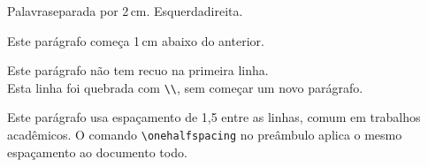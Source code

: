 \documentclass[a4paper]{article}
\begin{document}
Palavra\hspace{2cm}separada por 2\,cm. Esquerda\hfill direita.

\vspace{1cm}
Este parágrafo começa 1\,cm abaixo do anterior.

\noindent Este parágrafo não tem recuo na primeira linha.\\
Esta linha foi quebrada com \verb|\\|, sem começar um novo parágrafo.

\begin{onehalfspace}
Este parágrafo usa espaçamento de 1,5 entre as linhas, comum em trabalhos
acadêmicos. O comando \verb|\onehalfspacing| no preâmbulo aplica o mesmo
espaçamento ao documento todo.
\end{onehalfspace}
\end{document}

